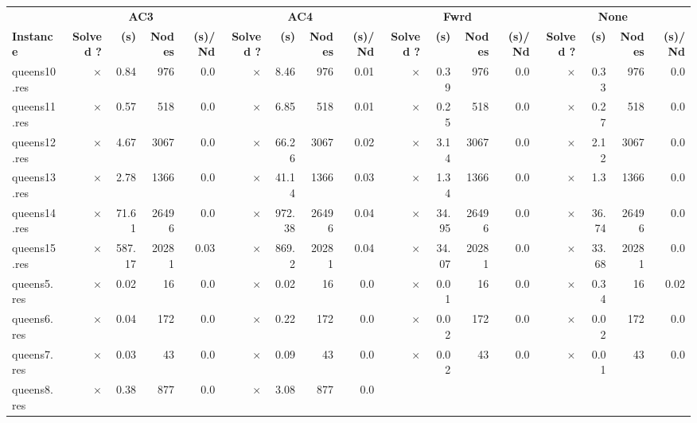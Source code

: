 \documentclass[main.tex]{subfiles}
\begin{document}
\begin{landscape}
\begin{center}
\renewcommand{\arraystretch}{1.4} 
\begin{tabular}{l
rrrrrrrrrrrrrrrr}
	\hline
 & \multicolumn{4}{c}{\textbf{AC3}} & \multicolumn{4}{c}{\textbf{AC4}} & \multicolumn{4}{c}{\textbf{Fwrd}} & \multicolumn{4}{c}{\textbf{None}}\\
\textbf{Instance}  & \textbf{Solved ?} & \textbf{(s)} & \textbf{Nodes} & \textbf{(s)/Nd} & \textbf{Solved ?} & \textbf{(s)} & \textbf{Nodes} & \textbf{(s)/Nd} & \textbf{Solved ?} & \textbf{(s)} & \textbf{Nodes} & \textbf{(s)/Nd} & \textbf{Solved ?} & \textbf{(s)} & \textbf{Nodes} & \textbf{(s)/Nd}\\\hline

queens10.res & 
$\times$
 & 0.84 & 976 & 0.0
 & 
$\times$
 & 8.46 & 976 & 0.01
 & 
$\times$
 & 0.39 & 976 & 0.0
 & 
$\times$
 & 0.33 & 976 & 0.0
\\
queens11.res & 
$\times$
 & 0.57 & 518 & 0.0
 & 
$\times$
 & 6.85 & 518 & 0.01
 & 
$\times$
 & 0.25 & 518 & 0.0
 & 
$\times$
 & 0.27 & 518 & 0.0
\\
queens12.res & 
$\times$
 & 4.67 & 3067 & 0.0
 & 
$\times$
 & 66.26 & 3067 & 0.02
 & 
$\times$
 & 3.14 & 3067 & 0.0
 & 
$\times$
 & 2.12 & 3067 & 0.0
\\
queens13.res & 
$\times$
 & 2.78 & 1366 & 0.0
 & 
$\times$
 & 41.14 & 1366 & 0.03
 & 
$\times$
 & 1.34 & 1366 & 0.0
 & 
$\times$
 & 1.3 & 1366 & 0.0
\\
queens14.res & 
$\times$
 & 71.61 & 26496 & 0.0
 & 
$\times$
 & 972.38 & 26496 & 0.04
 & 
$\times$
 & 34.95 & 26496 & 0.0
 & 
$\times$
 & 36.74 & 26496 & 0.0
\\
queens15.res & 
$\times$
 & 587.17 & 20281 & 0.03
 & 
$\times$
 & 869.2 & 20281 & 0.04
 & 
$\times$
 & 34.07 & 20281 & 0.0
 & 
$\times$
 & 33.68 & 20281 & 0.0
\\
queens5.res & 
$\times$
 & 0.02 & 16 & 0.0
 & 
$\times$
 & 0.02 & 16 & 0.0
 & 
$\times$
 & 0.01 & 16 & 0.0
 & 
$\times$
 & 0.34 & 16 & 0.02
\\
queens6.res & 
$\times$
 & 0.04 & 172 & 0.0
 & 
$\times$
 & 0.22 & 172 & 0.0
 & 
$\times$
 & 0.02 & 172 & 0.0
 & 
$\times$
 & 0.02 & 172 & 0.0
\\
queens7.res & 
$\times$
 & 0.03 & 43 & 0.0
 & 
$\times$
 & 0.09 & 43 & 0.0
 & 
$\times$
 & 0.02 & 43 & 0.0
 & 
$\times$
 & 0.01 & 43 & 0.0
\\
queens8.res & 
$\times$
 & 0.38 & 877 & 0.0
 & 
$\times$
 & 3.08 & 877 & 0.0
 & 

\end{tabular}
\end{center}
\end{landscape}
\end{document}
